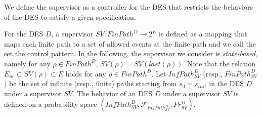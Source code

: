 We define the supervisor as a controller for the DES that restricts the behaviors of the DES to satisfy a given specification.

\begin{definition}[Supervisor]
For the DES $D$,  a supervisor $SV : FinPath^{D} \rightarrow 2^E$ is defined as a mapping that maps each finite path to a set of allowed events at the finite path and we call the set the control pattern. In the following, the supervisor we consider is {\it state-based}, namely for any $\rho \in FinPath^{D}$, $SV(\rho) = SV(last(\rho))$. Note that the relation $E_{uc} \subset SV(\rho) \subset E$ holds for any $\rho \in FinPath^D$.
Let $InfPath^{D}_{SV}$ (resp., $FinPath^{D}_{SV}$) be the set of infinite (resp., finite) paths starting from $s_0=s_{init}$ in the DES $D$ under a supervisor $SV$. The behavior of an DES $D$ under a supervisor $SV$ is defined on a probability space $(InfPath^{D}_{SV}, \mathcal{F}_{InfPath^{D}_{SV}}, Pr^{D}_{SV})$.
\end{definition}

